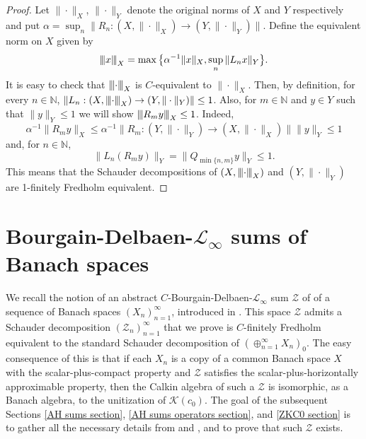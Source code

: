\documentclass[11pt]{amsart}
\theoremstyle{definition}
\newcommand{\N}{\mathbb{N}}
\newcommand{\trn}[1]{{\left\vert\kern-0.25ex\left\vert\kern-0.25ex\left\vert #1 
    \right\vert\kern-0.25ex\right\vert\kern-0.25ex\right\vert}}
\numberwithin{equation}{section}
\begin{document}
\begin{proof}
Let $\|\cdot\|_X$, $\|\cdot\|_Y$ denote the original norms of $X$ and $Y$ respectively and put $\alpha = \sup_n\|R_n:(X,\|\cdot\|_X)\to (Y,\|\cdot\|_Y)\|$. Define the equivalent norm on $X$ given by
\[\trn{x}_X = \max\big\{\alpha^{-1}\|x\|_X,\sup_n\|L_nx\|_Y\big\}.\]
It is easy to check that $\trn{\cdot}_X$ is $C$-equivalent to $\|\cdot\|_X$. Then, by definition, for every $n\in\N$, $\|L_n:(X,\trn{\cdot}_X)\to (Y,\|\cdot\|_Y)\|\leq 1$. Also, for $m\in\N$ and $y\in Y$ such that $\|y\|_Y\leq 1$ we will show $\trn{R_my}_X\leq 1$. Indeed,
\[\alpha^{-1}\|R_my\|_X \leq \alpha^{-1}\|R_m:(Y,\|\cdot\|_Y)\to(X,\|\cdot\|_X)\|\|y\|_Y\leq 1\]
and, for $n\in\N$,
\[\|L_n(R_my)\|_Y = \|Q_{\min\{n,m\}}y\|_Y \leq 1.\]
This means that the Schauder decompositions of $(X,\trn{\cdot}_X)$ and $(Y,\|\cdot\|_Y)$ are 1-finitely Fredholm equivalent.
\end{proof}











\section{Bourgain-Delbaen-$\mathscr{L}_\infty$ sums of Banach spaces}
\label{abstract Bourgain-Delbaen sums}
We recall the notion of an abstract $C$-Bourgain-Delbaen-$\mathscr{L}_\infty$ sum $\mathcal{Z}$ of of a sequence of Banach spaces $(X_n)_{n=1}^\infty$, introduced in \cite[Definition 2.3]{zisimopoulou:2014}. This space $\mathcal{Z}$ admits a Schauder decomposition $(\mathcal{Z}_n)_{n=1}^\infty$ that we prove is $C$-finitely Fredholm equivalent to the standard Schauder decomposition of $(\oplus_{n=1}^\infty X_n)_0$. The easy consequence of this is that if each $X_n$ is a copy of a common Banach space $X$ with the scalar-plus-compact property and $\mathcal{Z}$ satisfies the scalar-plus-horizontally approximable property, then the Calkin algebra of such a $\mathcal{Z}$ is isomorphic, as a Banach algebra, to the unitization of $\mathcal{K}(c_0)$. The goal of the subsequent Sections \ref{AH sums section}, \ref{AH sums operators section}, and \ref{ZKC0 section} is to gather all the necessary details from \cite{argyros:haydon:2011} and \cite{zisimopoulou:2014}, and to prove that such $\mathcal{Z}$ exists.
\end{document}
